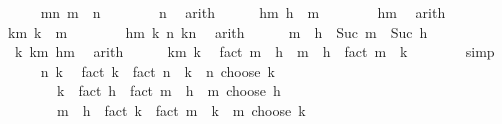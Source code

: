 \begin{isabellebody}
\ \ \ \ \isamarkupfalse%
\ mn{\isacharcolon}{\kern0pt}\ {\isachardoublequoteopen}m\ {\isacharless}{\kern0pt}\ n{\isachardoublequoteclose}\isanewline
\ \ \ \ \ \ \isamarkupfalse%
\ n\ \isamarkupfalse%
\ arith\isanewline
\ \ \ \ \isamarkupfalse%
\ hm{\isacharprime}{\kern0pt}{\isacharcolon}{\kern0pt}\ {\isachardoublequoteopen}h\ {\isasymle}\ m{\isachardoublequoteclose}\isanewline
\ \ \ \ \ \ \isamarkupfalse%
\ hm\ \isamarkupfalse%
\ arith\isanewline
\ \ \ \ \isamarkupfalse%
\ km{\isacharcolon}{\kern0pt}\ {\isachardoublequoteopen}k\ {\isasymle}\ m{\isachardoublequoteclose}\isanewline
\ \ \ \ \ \ \isamarkupfalse%
\ hm\ k\ n\ kn\ \isamarkupfalse%
\ arith\isanewline
\ \ \ \ \isamarkupfalse%
\ {\isachardoublequoteopen}m\ {\isacharminus}{\kern0pt}\ h\ {\isacharequal}{\kern0pt}\ Suc\ {\isacharparenleft}{\kern0pt}m\ {\isacharminus}{\kern0pt}\ Suc\ h{\isacharparenright}{\kern0pt}{\isachardoublequoteclose}\isanewline
\ \ \ \ \ \ \isamarkupfalse%
\ \ k\ km\ hm\ \isamarkupfalse%
\ arith\isanewline
\ \ \ \ \isamarkupfalse%
\ km\ k\ \isamarkupfalse%
\ {\isachardoublequoteopen}fact\ {\isacharparenleft}{\kern0pt}m\ {\isacharminus}{\kern0pt}\ h{\isacharparenright}{\kern0pt}\ {\isacharequal}{\kern0pt}\ {\isacharparenleft}{\kern0pt}m\ {\isacharminus}{\kern0pt}\ h{\isacharparenright}{\kern0pt}\ {\isacharasterisk}{\kern0pt}\ fact\ {\isacharparenleft}{\kern0pt}m\ {\isacharminus}{\kern0pt}\ k{\isacharparenright}{\kern0pt}{\isachardoublequoteclose}\isanewline
\ \ \ \ \ \ \isamarkupfalse%
\ simp\isanewline
\ \ \ \ \isamarkupfalse%
\ n\ k\ \isamarkupfalse%
\ {\isachardoublequoteopen}fact\ k\ {\isacharasterisk}{\kern0pt}\ fact\ {\isacharparenleft}{\kern0pt}n\ {\isacharminus}{\kern0pt}\ k{\isacharparenright}{\kern0pt}\ {\isacharasterisk}{\kern0pt}\ {\isacharparenleft}{\kern0pt}n\ choose\ k{\isacharparenright}{\kern0pt}\ {\isacharequal}{\kern0pt}\isanewline
\ \ \ \ \ \ \ \ k\ {\isacharasterisk}{\kern0pt}\ {\isacharparenleft}{\kern0pt}fact\ h\ {\isacharasterisk}{\kern0pt}\ fact\ {\isacharparenleft}{\kern0pt}m\ {\isacharminus}{\kern0pt}\ h{\isacharparenright}{\kern0pt}\ {\isacharasterisk}{\kern0pt}\ {\isacharparenleft}{\kern0pt}m\ choose\ h{\isacharparenright}{\kern0pt}{\isacharparenright}{\kern0pt}\ {\isacharplus}{\kern0pt}\isanewline
\ \ \ \ \ \ \ \ {\isacharparenleft}{\kern0pt}m\ {\isacharminus}{\kern0pt}\ h{\isacharparenright}{\kern0pt}\ {\isacharasterisk}{\kern0pt}\ {\isacharparenleft}{\kern0pt}fact\ k\ {\isacharasterisk}{\kern0pt}\ fact\ {\isacharparenleft}{\kern0pt}m\ {\isacharminus}{\kern0pt}\ k{\isacharparenright}{\kern0pt}\ {\isacharasterisk}{\kern0pt}\ {\isacharparenleft}{\kern0pt}m\ choose\ k{\isacharparenright}{\kern0pt}{\isacharparenright}{\kern0pt}{\isachardoublequoteclose}\isanewline

\end{isabellebody}
